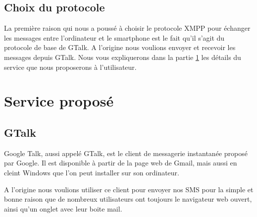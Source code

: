 \subsection{Choix du protocole}

La première raison qui nous a poussé à choisir le protocole XMPP pour échanger les messages entre l'ordinateur et le smartphone est le fait qu'il s'agit du protocole de base de GTalk.
A l'origine nous voulions envoyer et recevoir les messages depuis GTalk.
Nous vous expliquerons dans la partie \ref{Service proposé} les détails du service que nous proposerons à l'utilisateur.
\\






\section{Service proposé}
\label{Service proposé}


\subsection{GTalk}

Google Talk, aussi appelé GTalk, est le client de messagerie instantanée proposé par Google.
Il est disponible à partir de la page web de Gmail, mais aussi en cleint Windows que l'on peut installer sur son ordinateur.

A l'origine nous voulions utiliser ce client pour envoyer nos SMS pour la simple et bonne raison que de nombreux utilisateurs ont toujours le navigateur web ouvert, ainsi qu'un onglet avec leur boite mail.
\\

